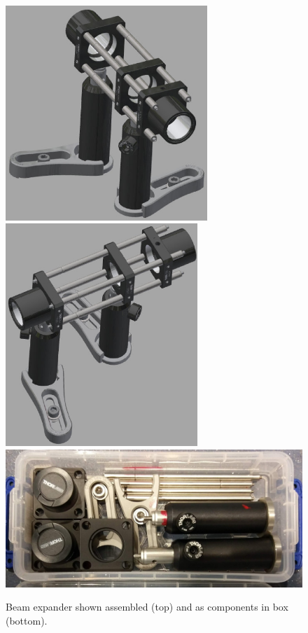 \documentclass[a4paper]{report}
\begin{document}
\begin{figure}[h]
\center
\includegraphics[width=3in]{expander_CAD_01.eps}
\includegraphics[width=2.85in]{expander_CAD_02.eps}
\includegraphics[width=5in]{beam_expander_box.eps}
\caption{Beam expander shown assembled (top) and as components in box (bottom).}
\label{fig:beamExpander}
\end{figure}


\clearpage
\end{document}
